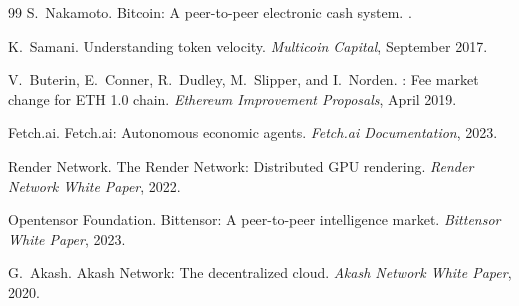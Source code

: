 \documentclass[11pt]{article}
\begin{document}
\begin{thebibliography}{99}
S.~Nakamoto.
\newblock Bitcoin: A peer-to-peer electronic cash system.
.

K.~Samani.
\newblock Understanding token velocity.
\newblock \emph{Multicoin Capital}, September 2017.

V.~Buterin, E.~Conner, R.~Dudley, M.~Slipper, and I.~Norden.
: Fee market change for {ETH 1.0} chain.
\newblock \emph{Ethereum Improvement Proposals}, April 2019.

{Fetch.ai}.
\newblock Fetch.ai: Autonomous economic agents.
\newblock \emph{Fetch.ai Documentation}, 2023.

{Render Network}.
\newblock The Render Network: Distributed {GPU} rendering.
\newblock \emph{Render Network White Paper}, 2022.

{Opentensor Foundation}.
\newblock Bittensor: A peer-to-peer intelligence market.
\newblock \emph{Bittensor White Paper}, 2023.

G.~Akash.
\newblock Akash Network: The decentralized cloud.
\newblock \emph{Akash Network White Paper}, 2020.

\end{thebibliography}
\end{document}

